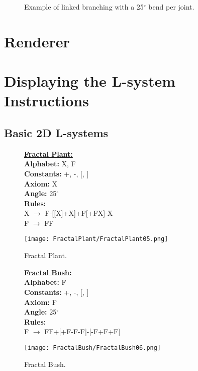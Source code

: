 \begin{flushleft}
\FloatBarrier

\begin{figure}[htbp]
	{\centering
		\vspace{7px}
		\setlength{\fboxrule}{1pt}
		\caption{Example of linked branching with a 25$^{\circ}$ bend per joint.}
	}
\end{figure}

\FloatBarrier

\end{flushleft}

\section{Renderer}

\begin{flushleft}


\end{flushleft}

\section{Displaying the L-system Instructions} \label{Display L-system Instructions}

\subsection{Basic 2D L-systems} 


\begin{figure}[htbp]
	\raggedright
	\textbf{\underline{Fractal Plant:}} \\
	\textbf{Alphabet:} X, F\\
	\textbf{Constants:} +, -, [, ] \\
	\textbf{Axiom:} X \\
	\textbf{Angle:} 25$^\circ$ \\
	\textbf{Rules:} \\
	X $\rightarrow$ F-[[X]+X]+F[+FX]-X\\
	F $\rightarrow$ FF \\
	{\centering
		\vspace{7px}
		\texttt{[image: FractalPlant/FractalPlant05.png]}
		\caption{Fractal Plant.}
	}
\end{figure}
\begin{figure}[htbp]
	\raggedright
	\textbf{\underline{Fractal Bush:}} \\
	\textbf{Alphabet:} F\\
	\textbf{Constants:} +, -, [, ] \\
	\textbf{Axiom:} F \\
	\textbf{Angle:} 25$^\circ$ \\
	\textbf{Rules:} \\
	F $\rightarrow$ FF+[+F-F-F]-[-F+F+F]\\
	{\centering
		\vspace{7px}
		\texttt{[image: FractalBush/FractalBush06.png]}
		\caption{Fractal Bush.}
	}
\end{figure}

